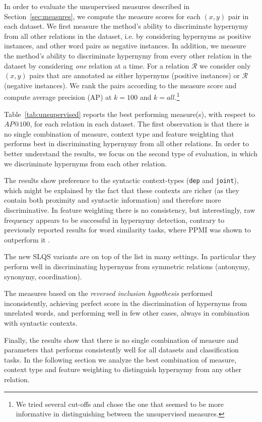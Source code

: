 \documentclass[11pt]{article}
\newcommand\smalltt[1]{\texttt{\small #1}}
\begin{document}
In order to evaluate the unsupervised measures described in Section~\ref{sec:measures}, we compute the measure scores for each $(x, y)$ pair in each dataset. 
We first measure the method's ability to discriminate hypernymy from all other relations in the dataset, i.e. by considering hypernyms as positive instances, and other word pairs as negative instances. In addition, we measure the method's ability to discriminate hypernymy from every other relation in the dataset by considering \emph{one} relation at a time. For a relation $\mathcal{R}$ we consider only $(x, y)$ pairs that are annotated as either hypernyms (positive instances) or $\mathcal{R}$ (negative instances). We rank the pairs according to the measure score and compute average precision (AP) at $k=100$ and $k=all$.\footnote{We tried several cut-offs and chose the one that seemed to be more informative in distinguishing between the unsupervised measures.}

Table~\ref{tab:unsupervised} reports the best performing measure(s), with respect to $AP@100$, for each relation in each dataset. The first observation is that there is no single combination of measure, context type and feature weighting that performs best in discriminating hypernymy from all other relations. In order to better understand the results, we focus on the second type of evaluation, in which we discriminate hypernyms from each other relation. 

The results show preference to the syntactic context-types (\smalltt{dep} and \smalltt{joint}), which might be explained by the fact that these contexts are richer (as they contain both proximity and syntactic information) and therefore more discriminative. In feature weighting there is no consistency, but interestingly, raw frequency appears to be successful in hypernymy detection, contrary to previously reported results for word similarity tasks, where PPMI was shown to outperform it \cite{bullinaria2007extracting,levy2015improving}. 

The new SLQS variants are on top of the list in many settings. In particular they perform well in discriminating hypernyms from symmetric relations (antonymy, synonymy, coordination). 

The measures based on the \emph{reversed inclusion hypothesis} performed inconsistently, achieving perfect score in the discrimination of hypernyms from unrelated words, and performing well in few other cases, always in combination with syntactic contexts.

Finally, the results show that there is no single combination of measure and parameters that performs consistently well for all datasets and classification tasks. In the following section we analyze the best combination of measure, context type and feature weighting to distinguish hypernymy from any other relation. 
\end{document}
